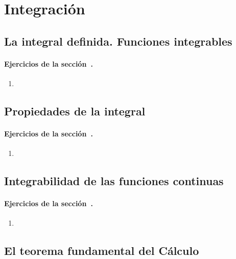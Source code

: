 
\chapter{Integración}

\section{La integral definida. Funciones integrables}


\subsubsection*{Ejercicios de la sección~.}

\begin{enumerate}
\item 
\end{enumerate}


\section{Propiedades de la integral}


\subsubsection*{Ejercicios de la sección~.}

\begin{enumerate}
\item 
\end{enumerate}


\section{Integrabilidad de las funciones continuas}


\subsubsection*{Ejercicios de la sección~.}

\begin{enumerate}
\item 
\end{enumerate}


\section{El teorema fundamental del Cálculo}


